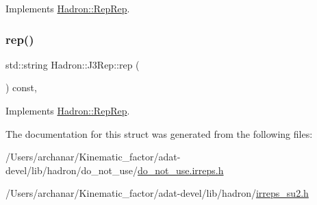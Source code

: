 Implements \mbox{\hyperlink{structHadron_1_1RepRep_ab3213025f6de249f7095892109575fde}{Hadron\+::\+Rep\+Rep}}.

\mbox{\label{structHadron_1_1J3Rep_ab890e5844d6c221d555b2049711e89a6}} 
\subsubsection{\texorpdfstring{rep()}{rep()}\hspace{0.1cm}{\footnotesize\ttfamily [5/5]}}
{\footnotesize\ttfamily std\+::string Hadron\+::\+J3\+Rep\+::rep (\begin{DoxyParamCaption}{ }\end{DoxyParamCaption}) const\hspace{0.3cm}{\ttfamily [inline]}, {\ttfamily [virtual]}}



Implements \mbox{\hyperlink{structHadron_1_1RepRep_ab3213025f6de249f7095892109575fde}{Hadron\+::\+Rep\+Rep}}.



The documentation for this struct was generated from the following files\+:\begin{DoxyCompactItemize}
\item 
/\+Users/archanar/\+Kinematic\+\_\+factor/adat-\/devel/lib/hadron/do\+\_\+not\+\_\+use/\mbox{\hyperlink{adat-devel_2lib_2hadron_2do__not__use_2do__not__use_8irreps_8h}{do\+\_\+not\+\_\+use.\+irreps.\+h}}\item 
/\+Users/archanar/\+Kinematic\+\_\+factor/adat-\/devel/lib/hadron/\mbox{\hyperlink{adat-devel_2lib_2hadron_2irreps__su2_8h}{irreps\+\_\+su2.\+h}}\end{DoxyCompactItemize}
